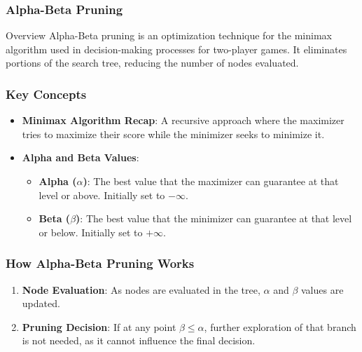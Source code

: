 \documentclass[aspectratio=169]{beamer}
\begin{document}
\begin{frame}[fragile]
    \frametitle{Alpha-Beta Pruning}
    \begin{block}{Overview}
        Alpha-Beta pruning is an optimization technique for the minimax algorithm used in decision-making processes for two-player games. It eliminates portions of the search tree, reducing the number of nodes evaluated.
    \end{block}
\end{frame}

\begin{frame}[fragile]
    \frametitle{Key Concepts}
    \begin{itemize}
        \item \textbf{Minimax Algorithm Recap}: 
          A recursive approach where the maximizer tries to maximize their score while the minimizer seeks to minimize it.
        \item \textbf{Alpha and Beta Values}:
          \begin{itemize}
            \item \textbf{Alpha ($\alpha$)}: The best value that the maximizer can guarantee at that level or above. Initially set to $-\infty$.
            \item \textbf{Beta ($\beta$)}: The best value that the minimizer can guarantee at that level or below. Initially set to $+\infty$.
          \end{itemize}
    \end{itemize}
\end{frame}

\begin{frame}[fragile]
    \frametitle{How Alpha-Beta Pruning Works}
    \begin{enumerate}
        \item \textbf{Node Evaluation}: As nodes are evaluated in the tree, $\alpha$ and $\beta$ values are updated.
        \item \textbf{Pruning Decision}: If at any point $\beta \leq \alpha$, further exploration of that branch is not needed, as it cannot influence the final decision.
    \end{enumerate}
\end{frame}
\end{document}
